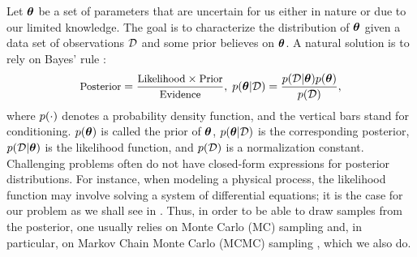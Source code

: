 Let ${\boldsymbol\theta}$ be a set of parameters that are uncertain for us either in nature or due to our limited knowledge. The goal is to characterize the distribution of ${\boldsymbol\theta}$ given a data set of observations $\mathcal{D}$ and some prior believes on ${\boldsymbol\theta}$. A natural solution is to rely on Bayes' rule \cite{gelman2004}:
\begin{equation} \elabel{bayes}
  \text{\small Posterior} = \frac{\text{\small Likelihood} \times \text{\small Prior}}{\text{\small Evidence}}, \; \f{\vparam | \Data} = \frac{\f{\Data | \vparam} \f{\vparam}}{\f{\Data}},
\end{equation}
where $\f{\cdot}$ denotes a probability density function, and the vertical bars stand for conditioning. $\f{\vparam}$ is called the prior of ${\boldsymbol\theta}$, $\f{\vparam | \Data}$ is the corresponding posterior, $\f{\Data | \vparam}$ is the likelihood function, and $\f{\Data}$ is a normalization constant. Challenging problems often do not have closed-form expressions for posterior distributions. For instance, when modeling a physical process, the likelihood function may involve solving a system of differential equations; it is the case for our problem as we shall see in . Thus, in order to be able to draw samples from the posterior, one usually relies on Monte Carlo (MC) sampling and, in particular, on Markov Chain Monte Carlo (MCMC) sampling \cite{gelman2004}, which we also do.

